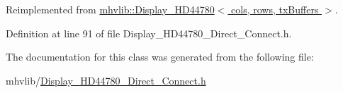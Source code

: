 Reimplemented from \hyperlink{classmhvlib_1_1_display___h_d44780_a22c01174d10b5567e3862f05c4e3ffe4}{mhvlib\-::\-Display\-\_\-\-H\-D44780$<$ cols, rows, tx\-Buffers $>$}.



Definition at line 91 of file Display\-\_\-\-H\-D44780\-\_\-\-Direct\-\_\-\-Connect.\-h.



The documentation for this class was generated from the following file\-:\begin{DoxyCompactItemize}
\item 
mhvlib/\hyperlink{_display___h_d44780___direct___connect_8h}{Display\-\_\-\-H\-D44780\-\_\-\-Direct\-\_\-\-Connect.\-h}\end{DoxyCompactItemize}
